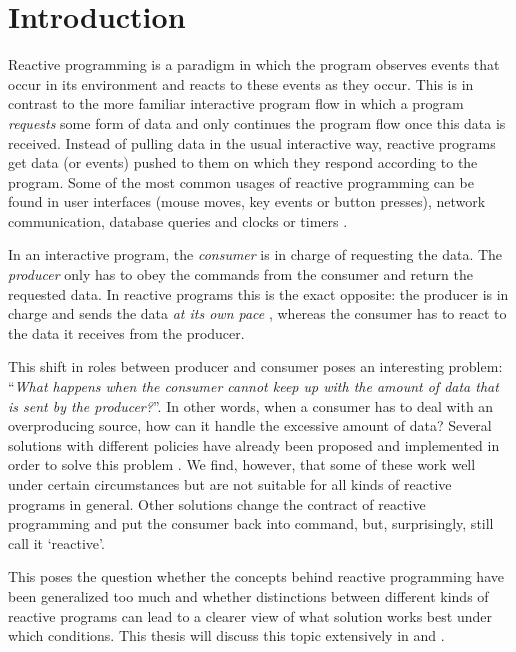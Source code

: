 \chapter*{Introduction}

Reactive programming is a paradigm in which the program observes events that occur in its environment and reacts to these events as they occur. This is in contrast to the more familiar interactive program flow in which a program \emph{requests} some form of data and only continues the program flow once this data is received. Instead of pulling data in the usual interactive way, reactive programs get data (or events) pushed to them on which they respond according to the program. Some of the most common usages of reactive programming can be found in user interfaces (mouse moves, key events or button presses), network communication, database queries and clocks or timers \cite{meijer2012-YMIAD}.

In an interactive program, the \textit{consumer} is in charge of requesting the data. The \textit{producer} only has to obey the commands from the consumer and return the requested data. In reactive programs this is the exact opposite: the producer is in charge and sends the data \emph{at its own pace} \cite{berry1991-Reactive}, whereas the consumer has to react to the data it receives from the producer.

This shift in roles between producer and consumer poses an interesting problem: ``\textit{What happens when the consumer cannot keep up with the amount of data that is sent by the producer?}''. In other words, when a consumer has to deal with an overproducing source, how can it handle the excessive amount of data? Several solutions with different policies have already been proposed and implemented in order to solve this problem \cite{RxJava-Wiki-Callstack-Blocking,RxJava-Wiki-Backpressure,Reactive-Streams}. We find, however, that some of these work well under certain circumstances but are not suitable for all kinds of reactive programs in general. Other solutions change the contract of reactive programming and put the consumer back into command, but, surprisingly, still call it `reactive'.

This poses the question whether the concepts behind reactive programming have been generalized too much and whether distinctions between different kinds of reactive programs can lead to a clearer view of what solution works best under which conditions. This thesis will discuss this topic extensively in  and .

